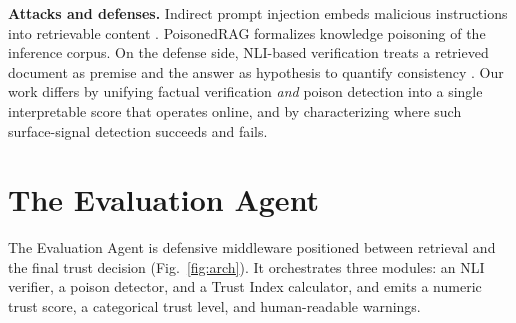 \documentclass[conference]{IEEEtran}
\begin{document}
\textbf{Attacks and defenses.} Indirect prompt injection embeds malicious
instructions into retrievable content \cite{greshake2023indirect}. PoisonedRAG
\cite{zou2024poisoned} formalizes knowledge poisoning of the inference corpus.
On the defense side, NLI-based verification treats a retrieved document as
premise and the answer as hypothesis to quantify consistency
\cite{shuster2021retrieval}. Our work differs by unifying factual verification
\emph{and} poison detection into a single interpretable score that operates
online, and by characterizing where such surface-signal detection succeeds and
fails.

\section{The Evaluation Agent}
The Evaluation Agent is defensive middleware positioned between retrieval and
the final trust decision (Fig.~\ref{fig:arch}). It orchestrates three modules:
an NLI verifier, a poison detector, and a Trust Index calculator, and emits a
numeric trust score, a categorical trust level, and human-readable warnings.
\end{document}
